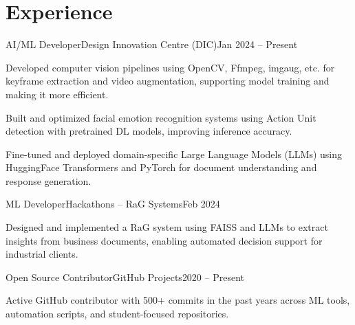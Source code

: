 \documentclass[10pt, letterpaper]{article}
\begin{document}
\section{Experience}
\begin{experienceentry}{AI/ML Developer}{Design Innovation Centre (DIC)}{Jan 2024 -- Present}
    \item Developed computer vision pipelines using OpenCV, Ffmpeg, imgaug, etc. for keyframe extraction and video augmentation, supporting model training and making it more efficient.
    \item Built and optimized facial emotion recognition systems using Action Unit detection with pretrained DL models, improving inference accuracy.
    \item Fine-tuned and deployed domain-specific Large Language Models (LLMs) using HuggingFace Transformers and PyTorch for document understanding and response generation.
\end{experienceentry}

\begin{experienceentry}{ML Developer}{Hackathons – RaG Systems}{Feb 2024}
    \item Designed and implemented a RaG system using FAISS and LLMs to extract insights from business documents, enabling automated decision support for industrial clients.
\end{experienceentry}

\begin{experienceentry}{Open Source Contributor}{GitHub Projects}{2020 -- Present}
    \item Active GitHub contributor with 500+ commits in the past years across ML tools, automation scripts, and student-focused repositories.
\end{experienceentry}

\end{document}
